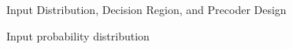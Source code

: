 \documentclass[journal]{IEEEtran}
\begin{document}
\begin{section}{Input Distribution, Decision Region, and Precoder Design}
\begin{subsection}{Input probability distribution}




\end{subsection}
\end{section}
\end{document}
